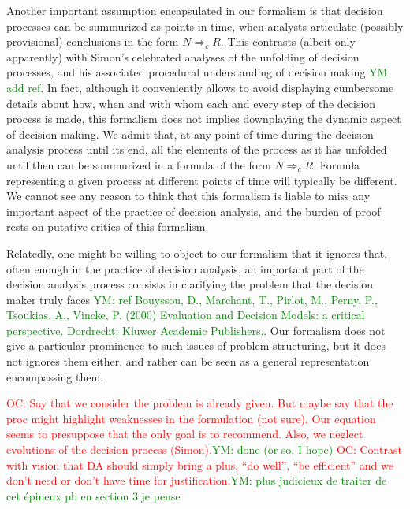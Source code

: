 \documentclass[preprint, french, english, 11pt, authoryear]{elsarticle}%
\newcommand{\commentYM}[1]{\textcolor{green}{YM: #1}}
\newcommand{\commentOC}[1]{\textcolor{red}{OC: #1}}
\begin{document}
Another important assumption encapsulated in our formalism is that decision processes can be summurized as points in time, when analysts articulate (possibly provisional) conclusions in the form $N ⇒_c R$. This contrasts (albeit only apparently) with Simon's celebrated analyses of the unfolding of decision processes, and his associated procedural understanding of decision making \commentYM{add ref}. In fact, although it conveniently allows to avoid displaying cumbersome details about how, when and with whom each and every step of the decision process is made, this formalism does not implies downplaying the dynamic aspect of decision making. We admit that, at any point of time during the decision analysis process until its end, all the elements of the process as it has unfolded until then can be summurized in a formula of the form $N ⇒_c R$. Formula representing a given process at different points of time will typically be different. We cannot see any reason to think that this formalism is liable to miss any important aspect of the practice of decision analysis, and the burden of proof rests on putative critics of this formalism.

Relatedly, one might be willing to object to our formalism that it ignores that, often enough in the practice of decision analysis, an important part of the decision analysis process consists in clarifying the problem that the decision maker truly faces \commentYM{ref Bouyssou, D., Marchant, T., Pirlot, M., Perny, P., Tsoukias, A., Vincke, P. (2000) Evaluation and Decision Models: a critical perspective. Dordrecht: Kluwer Academic Publishers.}. Our formalism does not give a particular prominence to such issues of problem structuring, but it does not ignores them either, and rather can be seen as a general representation encompassing them.

\commentOC{Say that we consider the problem is already given. But maybe say that the proc might highlight weaknesses in the formulation (not sure). Our equation seems to presuppose that the only goal is to recommend. Also, we neglect evolutions of the decision process (Simon).}\commentYM{done (or so, I hope)}
 \commentOC{Contrast with vision that DA should simply bring a plus, “do well”, “be efficient” and we don’t need or don’t have time for justification.}\commentYM{plus judicieux de traiter de cet épineux pb en section 3 je pense} 
 
\end{document}
